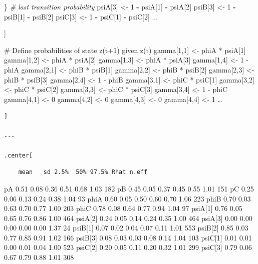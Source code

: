 \documentclass[
]{article}
\newenvironment{Shaded}{\begin{snugshade}}{\end{snugshade}}
\newcommand{\CommentTok}[1]{\textcolor[rgb]{0.56,0.35,0.01}{\textit{#1}}}
\newcommand{\DecValTok}[1]{\textcolor[rgb]{0.00,0.00,0.81}{#1}}
\newcommand{\NormalTok}[1]{#1}
\newcommand{\OperatorTok}[1]{\textcolor[rgb]{0.81,0.36,0.00}{\textbf{#1}}}
\newcommand{\StringTok}[1]{\textcolor[rgb]{0.31,0.60,0.02}{#1}}
\begin{document}
\begin{Shaded}
\begin{Highlighting}[]
\NormalTok{  \}}
  \CommentTok{\# last transition probability}
\NormalTok{  psiA[}\DecValTok{3}\NormalTok{] \textless{}{-}}\StringTok{ }\DecValTok{1} \OperatorTok{{-}}\StringTok{ }\NormalTok{psiA[}\DecValTok{1}\NormalTok{] }\OperatorTok{{-}}\StringTok{ }\NormalTok{psiA[}\DecValTok{2}\NormalTok{]}
\NormalTok{  psiB[}\DecValTok{3}\NormalTok{] \textless{}{-}}\StringTok{ }\DecValTok{1} \OperatorTok{{-}}\StringTok{ }\NormalTok{psiB[}\DecValTok{1}\NormalTok{] }\OperatorTok{{-}}\StringTok{ }\NormalTok{psiB[}\DecValTok{2}\NormalTok{]}
\NormalTok{  psiC[}\DecValTok{3}\NormalTok{] \textless{}{-}}\StringTok{ }\DecValTok{1} \OperatorTok{{-}}\StringTok{ }\NormalTok{psiC[}\DecValTok{1}\NormalTok{] }\OperatorTok{{-}}\StringTok{ }\NormalTok{psiC[}\DecValTok{2}\NormalTok{]}
\NormalTok{...}
\end{Highlighting}
\end{Shaded}

{]}

\# Define probabilities of state z(t+1) given z(t) gamma{[}1,1{]}
\textless- phiA * psiA{[}1{]} gamma{[}1,2{]} \textless- phiA *
psiA{[}2{]} gamma{[}1,3{]} \textless- phiA * psiA{[}3{]} gamma{[}1,4{]}
\textless- 1 - phiA gamma{[}2,1{]} \textless- phiB * psiB{[}1{]}
gamma{[}2,2{]} \textless- phiB * psiB{[}2{]} gamma{[}2,3{]} \textless-
phiB * psiB{[}3{]} gamma{[}2,4{]} \textless- 1 - phiB gamma{[}3,1{]}
\textless- phiC * psiC{[}1{]} gamma{[}3,2{]} \textless- phiC *
psiC{[}2{]} gamma{[}3,3{]} \textless- phiC * psiC{[}3{]} gamma{[}3,4{]}
\textless- 1 - phiC gamma{[}4,1{]} \textless- 0 gamma{[}4,2{]}
\textless- 0 gamma{[}4,3{]} \textless- 0 gamma{[}4,4{]} \textless- 1
\ldots{}

\begin{verbatim}
]

---

.center[
\end{verbatim}

\begin{verbatim}
    mean   sd 2.5%  50% 97.5% Rhat n.eff
\end{verbatim}

pA 0.51 0.08 0.36 0.51 0.68 1.03 182 pB 0.45 0.05 0.37 0.45 0.55 1.01
151 pC 0.25 0.06 0.13 0.24 0.38 1.04 93 phiA 0.60 0.05 0.50 0.60 0.70
1.06 223 phiB 0.70 0.03 0.63 0.70 0.77 1.00 203 phiC 0.78 0.08 0.64 0.77
0.94 1.04 97 psiA{[}1{]} 0.76 0.05 0.65 0.76 0.86 1.00 464 psiA{[}2{]}
0.24 0.05 0.14 0.24 0.35 1.00 464 psiA{[}3{]} 0.00 0.00 0.00 0.00 0.00
1.37 24 psiB{[}1{]} 0.07 0.02 0.04 0.07 0.11 1.01 553 psiB{[}2{]} 0.85
0.03 0.77 0.85 0.91 1.02 166 psiB{[}3{]} 0.08 0.03 0.03 0.08 0.14 1.04
103 psiC{[}1{]} 0.01 0.01 0.00 0.01 0.04 1.00 523 psiC{[}2{]} 0.20 0.05
0.11 0.20 0.32 1.01 299 psiC{[}3{]} 0.79 0.06 0.67 0.79 0.88 1.01 308
\end{document}
